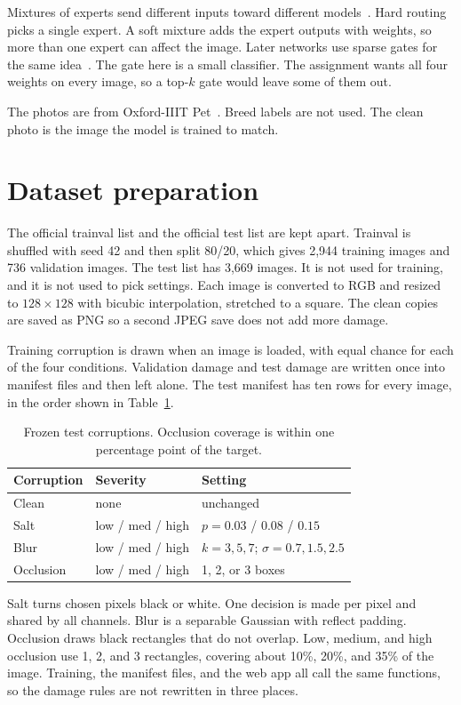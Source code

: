 \documentclass[conference]{IEEEtran}
\begin{document}
Mixtures of experts send different inputs toward different models~\cite{jacobs1991}. Hard routing picks a single expert. A soft mixture adds the expert outputs with weights, so more than one expert can affect the image. Later networks use sparse gates for the same idea~\cite{shazeer2017}. The gate here is a small classifier. The assignment wants all four weights on every image, so a top-$k$ gate would leave some of them out.

The photos are from Oxford-IIIT Pet~\cite{parkhi2012}. Breed labels are not used. The clean photo is the image the model is trained to match.

\section{Dataset preparation}
The official trainval list and the official test list are kept apart. Trainval is shuffled with seed 42 and then split 80/20, which gives 2{,}944 training images and 736 validation images. The test list has 3{,}669 images. It is not used for training, and it is not used to pick settings. Each image is converted to RGB and resized to $128\times128$ with bicubic interpolation, stretched to a square. The clean copies are saved as PNG so a second JPEG save does not add more damage.

Training corruption is drawn when an image is loaded, with equal chance for each of the four conditions. Validation damage and test damage are written once into manifest files and then left alone. The test manifest has ten rows for every image, in the order shown in Table~\ref{tab:corrupt}.

\begin{table}[t]
\caption{Frozen test corruptions. Occlusion coverage is within one percentage point of the target.}
\label{tab:corrupt}
\centering
\small
\begin{tabular}{@{}lll@{}}
\toprule
Corruption & Severity & Setting \\
\midrule
Clean & none & unchanged \\
Salt & low / med / high & $p=0.03$ / $0.08$ / $0.15$ \\
Blur & low / med / high & $k=3,5,7$; $\sigma=0.7,1.5,2.5$ \\
Occlusion & low / med / high & 1, 2, or 3 boxes \\
\bottomrule
\end{tabular}
\end{table}

Salt turns chosen pixels black or white. One decision is made per pixel and shared by all channels. Blur is a separable Gaussian with reflect padding. Occlusion draws black rectangles that do not overlap. Low, medium, and high occlusion use 1, 2, and 3 rectangles, covering about 10\%, 20\%, and 35\% of the image. Training, the manifest files, and the web app all call the same functions, so the damage rules are not rewritten in three places.
\end{document}
